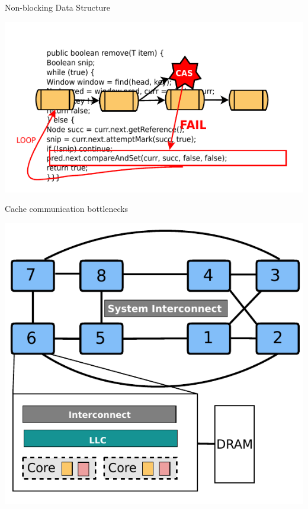 \documentclass[english]{beamer} %
\begin{document}
\begin{frame}{Non-blocking Data Structure}
\begin{center}
\includegraphics[scale=1.1]{fig/nonblock_fail}
\end{center}
\end{frame}

\begin{frame}{Cache communication bottlenecks}
\begin{center}
\includegraphics[scale=0.8]{fig/archcache_cas}
\end{center}
\end{frame}
\end{document}
